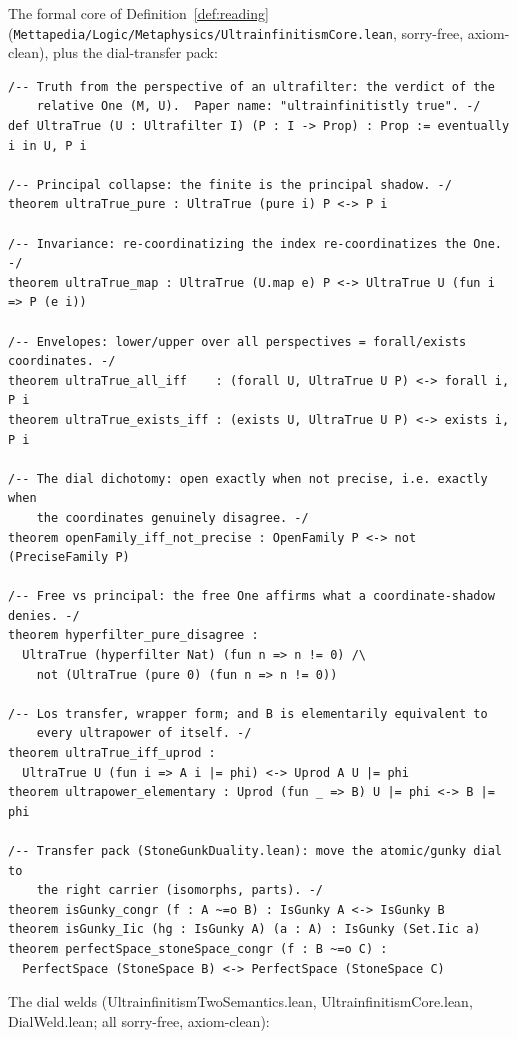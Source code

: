\documentclass[]{article}
\theoremstyle{definition}
\theoremstyle{remark}
\newcommand{\lpath}[1]{{\ttfamily\nolinkurl{#1}}}
\begin{document}
\noindent The formal core of Definition~\ref{def:reading}
(\lpath{Mettapedia/Logic/Metaphysics/UltrainfinitismCore.lean}, sorry-free,
axiom-clean), plus the dial-transfer pack:

\begin{lstlisting}
/-- Truth from the perspective of an ultrafilter: the verdict of the
    relative One (M, U).  Paper name: "ultrainfinitistly true". -/
def UltraTrue (U : Ultrafilter I) (P : I -> Prop) : Prop := eventually i in U, P i

/-- Principal collapse: the finite is the principal shadow. -/
theorem ultraTrue_pure : UltraTrue (pure i) P <-> P i

/-- Invariance: re-coordinatizing the index re-coordinatizes the One. -/
theorem ultraTrue_map : UltraTrue (U.map e) P <-> UltraTrue U (fun i => P (e i))

/-- Envelopes: lower/upper over all perspectives = forall/exists coordinates. -/
theorem ultraTrue_all_iff    : (forall U, UltraTrue U P) <-> forall i, P i
theorem ultraTrue_exists_iff : (exists U, UltraTrue U P) <-> exists i, P i

/-- The dial dichotomy: open exactly when not precise, i.e. exactly when
    the coordinates genuinely disagree. -/
theorem openFamily_iff_not_precise : OpenFamily P <-> not (PreciseFamily P)

/-- Free vs principal: the free One affirms what a coordinate-shadow denies. -/
theorem hyperfilter_pure_disagree :
  UltraTrue (hyperfilter Nat) (fun n => n != 0) /\
    not (UltraTrue (pure 0) (fun n => n != 0))

/-- Los transfer, wrapper form; and B is elementarily equivalent to
    every ultrapower of itself. -/
theorem ultraTrue_iff_uprod :
  UltraTrue U (fun i => A i |= phi) <-> Uprod A U |= phi
theorem ultrapower_elementary : Uprod (fun _ => B) U |= phi <-> B |= phi

/-- Transfer pack (StoneGunkDuality.lean): move the atomic/gunky dial to
    the right carrier (isomorphs, parts). -/
theorem isGunky_congr (f : A ~=o B) : IsGunky A <-> IsGunky B
theorem isGunky_Iic (hg : IsGunky A) (a : A) : IsGunky (Set.Iic a)
theorem perfectSpace_stoneSpace_congr (f : B ~=o C) :
  PerfectSpace (StoneSpace B) <-> PerfectSpace (StoneSpace C)
\end{lstlisting}

\noindent The dial welds (UltrainfinitismTwoSemantics.lean, UltrainfinitismCore.lean,
DialWeld.lean; all sorry-free, axiom-clean):
\end{document}
